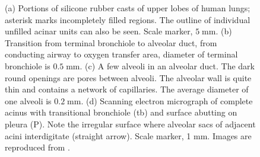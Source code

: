 \begin{figure}[H]
\begin{center}
\caption{ (a) Portions of silicone rubber casts of upper lobes
of human lungs; asterisk marks incompletely filled regions. The outline of individual unfilled acinar units can also be seen. Scale marker, $5\;\mbox{mm}$. (b) Transition from terminal bronchiole to alveolar duct, from conducting airway to oxygen transfer area, diameter of terminal bronchiole is $0.5 \;\mbox{mm}$. (c) A few alveoli in an alveolar duct. The dark round openings are pores between alveoli. The alveolar wall is quite thin and contains a network of capillaries. The average diameter of one alveoli is $0.2\;\mbox{mm}$. (d) Scanning electron micrograph of complete acinus with transitional bronchiole
(tb) and surface abutting on pleura (P). Note the irregular surface where alveolar sacs of adjacent acini interdigitate (straight arrow). Scale marker, 1 mm. Images are reproduced from \citet{lunglab}.
 }
  \end{center}
   \label{fig:acinar_units}
\end{figure}
%
\begin{table}[h]
\begin{center}
\end{center}
\caption{Shows dimensions, velocity and the corresponding Reynolds number for different sections of the airway tree during slow and rapid breathing. 
These values have been taken from \citet{pedley1970prediction}. }
\label{table:tree}
\end{table}
